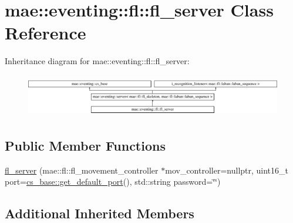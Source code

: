 \hypertarget{classmae_1_1eventing_1_1fl_1_1fl__server}{\section{mae\-:\-:eventing\-:\-:fl\-:\-:fl\-\_\-server Class Reference}
\label{classmae_1_1eventing_1_1fl_1_1fl__server}
}
Inheritance diagram for mae\-:\-:eventing\-:\-:fl\-:\-:fl\-\_\-server\-:\begin{figure}[H]
\begin{center}
\leavevmode
\includegraphics[height=1.883408cm]{classmae_1_1eventing_1_1fl_1_1fl__server}
\end{center}
\end{figure}
\subsection*{Public Member Functions}
\begin{DoxyCompactItemize}
\item 
\hyperlink{classmae_1_1eventing_1_1fl_1_1fl__server_a6358c3106e583a068508b97146aa3408}{fl\-\_\-server} (mae\-::fl\-::fl\-\_\-movement\-\_\-controller $\ast$mov\-\_\-controller=nullptr, uint16\-\_\-t port=\hyperlink{classmae_1_1eventing_1_1cs__base_a5c068f50b548ec7299133976c00fa5a4}{cs\-\_\-base\-::get\-\_\-default\-\_\-port}(), std\-::string password=\char`\"{}\char`\"{})
\end{DoxyCompactItemize}
\subsection*{Additional Inherited Members}


